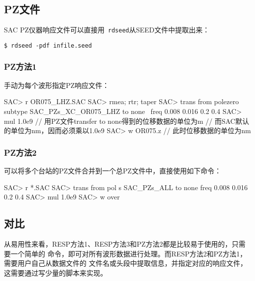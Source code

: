 \subsection{PZ文件}
SAC PZ仪器响应文件可以直接用~\verb+rdseed+从SEED文件中提取出来：
\begin{verbatim}
$ rdseed -pdf infile.seed
\end{verbatim}

\subsubsection{PZ方法1}
手动为每个波形指定PZ响应文件：
\begin{SACCode}
SAC> r OR075_LHZ.SAC
SAC> rmea; rtr; taper
SAC> trans from polezero subtype SAC_PZs_XC_OR075_LHZ to none \
                        freq 0.008 0.016 0.2 0.4
SAC> mul 1.0e9      // 用PZ文件transfer to none得到的位移数据的单位为m
                    // 而SAC默认的单位为nm，因而必须乘以1.0e9
SAC> w OR075.z      // 此时位移数据的单位为nm
\end{SACCode}

\subsubsection{PZ方法2}
可以将多个台站的PZ文件合并到一个总PZ文件中，直接使用如下命令：
\begin{SACCode}
SAC> r *.SAC
SAC> trans from pol s SAC_PZs_ALL to none freq 0.008 0.016 0.2 0.4
SAC> mul 1.0e9
SAC> w over
\end{SACCode}

\subsection{对比}
从易用性来看，RESP方法1、RESP方法3和PZ方法2都是比较易于使用的，只需要一个简单的
命令，即可对所有波形数据进行处理。而RESP方法2和PZ方法1，需要用户自己从数据文件的
文件名或头段中提取信息，并指定对应的响应文件，这需要通过写少量的脚本来实现。

